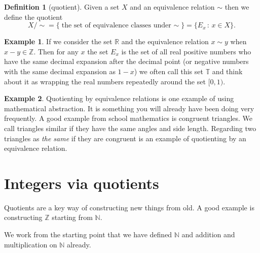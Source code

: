 \documentclass[
]{book}
\theoremstyle{definition}
\newtheorem{definition}{Definition}[chapter]
\theoremstyle{definition}
\newtheorem{example}{Example}[chapter]
\theoremstyle{definition}
\theoremstyle{definition}
\theoremstyle{remark}
\begin{document}
\begin{definition}[quotient]
Given a set \(X\) and an equivalence relation \(\sim\) then we define the quotient
\[ X/\sim = \{\mbox{the set of equivalence classes under \(\sim\)}\}= \{ E_x \,:\, x \in X\}.\]
\end{definition}

\begin{example}
If we consider the set \(\mathbb{R}\) and the equivalence relation \(x \sim y\) when \(x-y \in \mathbb{Z}\). Then for any \(x\) the set \(E_x\) is the set of all real positive numbers who have the same decimal expansion after the decimal point (or negative numbers with the same decimal expansion as \(1-x\)) we often call this set \(\mathbb{T}\) and think about it as wrapping the real numbers repeatedly around the set \([0,1)\).
\end{example}

\begin{example}
Quotienting by equivalence relations is one example of using mathematical abstraction. It is something you will already have been doing very frequently. A good example from school mathematics is congruent triangles. We call triangles similar if they have the same angles and side length. Regarding two triangles as \emph{the same} if they are congruent is an example of quotienting by an equivalence relation.
\end{example}

\section{Integers via quotients}\label{integers-via-quotients}

Quotients are a key way of constructing new things from old. A good example is constructing \(\mathbb{Z}\) starting from \(\mathbb{N}\).

We work from the starting point that we have defined \(\mathbb{N}\) and addition and multiplication on \(\mathbb{N}\) already.
\end{document}
